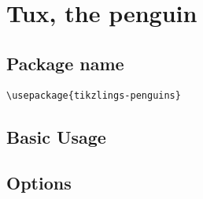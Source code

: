 \documentclass[parskip=half]{scrartcl}
\begin{document}
\begin{tcblisting}{}
\owl[3D]
\end{tcblisting}




\clearpage
\section[\textbackslash penguin]{Tux, the penguin}

\subsection{Package name}

\begin{tcolorbox}
\vspace*{0.5cm}
\lstinline|\usepackage{tikzlings-penguins}|
\vspace*{0.5cm}
\end{tcolorbox}

\subsection{Basic Usage}

\begin{tcblisting}{}
\penguin
\end{tcblisting}

\subsection{Options}

\begin{tcblisting}{}
\penguin[body=SteelBlue]
\end{tcblisting}

\begin{tcblisting}{}
\penguin[belly=red]
\end{tcblisting}

\begin{tcblisting}{}
\penguin[feet=red]
\end{tcblisting}

\begin{tcblisting}{}
\penguin[bill=red]
\end{tcblisting}

\begin{tcblisting}{}
\penguin[eye=red]
\end{tcblisting}
\end{document}
